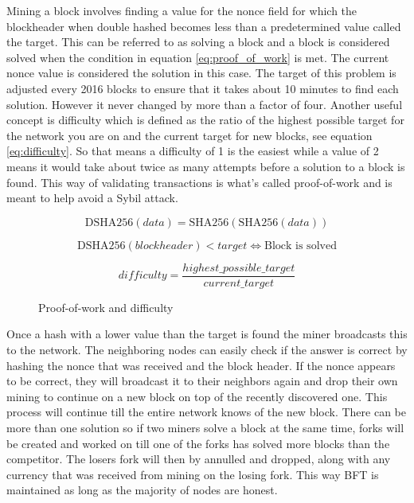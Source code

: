 \documentclass[12pt]{article}
\begin{document}
Mining a block involves finding a value for the nonce field for which the blockheader when double hashed becomes less than a predetermined value called the target. This can be referred to as solving a block and a block is considered solved when the condition in equation \ref{eq:proof_of_work} is met. The current nonce value is considered the solution in this case. The target of this problem is adjusted every 2016 blocks to ensure that it takes about 10 minutes to find each solution. However it never changed by more than a factor of four\cite{tschorsch2015bitcoin}. Another useful concept is difficulty which is defined as the ratio of the highest possible target for the network you are on and the current target for new blocks, see equation \ref{eq:difficulty}. So that means a difficulty of 1 is the easiest while a value of 2 means it would take about twice as many attempts before a solution to a block is found. This way of validating transactions is what's called proof-of-work and is meant to help avoid a Sybil attack\cite{tschorsch2015bitcoin}.

\begin{figure}[h!]
\begin{equation*}
\textrm{DSHA256}(\mathit{data}) = \textrm{SHA256}(\textrm{SHA256}(\mathit{data}))
\end{equation*}

\begin{equation}\label{eq:proof_of_work}
\textrm{DSHA256}(\mathit{blockheader}) < \mathit{target}
\Leftrightarrow \textrm{Block is solved}
\end{equation}

\begin{equation}\label{eq:difficulty}
\mathit{difficulty} = \frac{\mathit{highest\_possible\_target}}{\mathit{current\_target}}
\end{equation}
\caption{Proof-of-work and difficulty}
\end{figure}

Once a hash with a lower value than the target is found the miner broadcasts this to the network. The neighboring nodes can easily check if the answer is correct by hashing the nonce that was received and the block header. If the nonce appears to be correct, they will broadcast it to their neighbors again and drop their own mining to continue on a new block on top of the recently discovered one. This process will continue till the entire network knows of the new block. There can be more than one solution so if two miners solve a block at the same time, forks will be created and worked on till one of the forks has solved more blocks than the competitor. The losers fork will then by annulled and dropped, along with any currency that was received from mining on the losing fork. This way BFT is maintained as long as the majority of nodes are honest.
\end{document}
